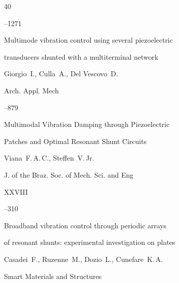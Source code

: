 \begin{thebibliography}{40}


--1271





\paper Multimode vibration control using several piezoelectric

transducers shunted with a multiterminal network

\by Giorgio~I., Culla~A., Del Vescovo~D.

\jour Arch. Appl. Mech




--879





\paper Multimodal Vibration Damping through Piezoelectric

Patches and Optimal Resonant Shunt Circuits

\by Viana~F.\,A.\,C., Steffen~V.\,Jr.

\jour J. of the Braz. Soc. of Mech. Sci. and Eng


\vol XXVIII


--310





\paper Broadband vibration control through periodic arrays

of resonant shunts: experimental investigation on plates

\by Casadei~F., Ruzenne~M., Dozio~L., Cunefare~K.\,A.

\jour Smart Materials and Structures










\end{thebibliography}
